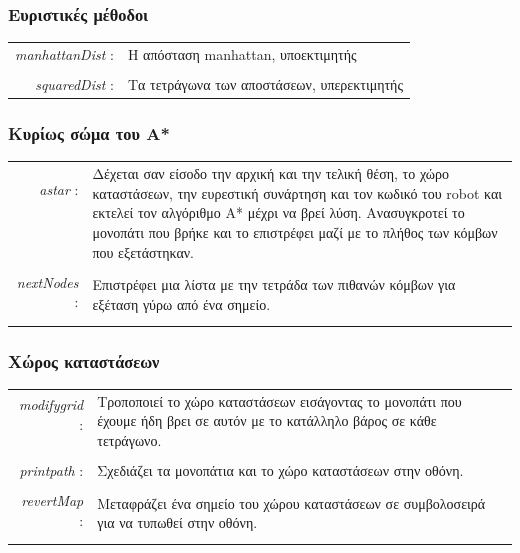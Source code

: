 \documentclass[a4paper,9pt]{article}
\begin{document}
\subsubsection{Eυριστικές μέθοδοι}
\begin{tabular}{r l}
    \emph{manhattanDist} :&Η απόσταση manhattan, υποεκτιμητής\\
    &\\
    \emph{squaredDist} :&Τα τετράγωνα των αποστάσεων, υπερεκτιμητής\\
\end{tabular}
\subsubsection{Κυρίως σώμα του Α*}
\begin{tabular}{r l}
    \emph{astar} :&\multirow{5}{10cm}{Δέχεται σαν είσοδο την αρχική και την τελική θέση, το χώρο
        καταστάσεων, την ευρεστική συνάρτηση και τον κωδικό του robot και εκτελεί
        τον αλγόριθμο Α* μέχρι να βρεί λύση. Ανασυγκροτεί το μονοπάτι που βρήκε
        και το επιστρέφει μαζί με το πλήθος των κόμβων που εξετάστηκαν.}\\
    &\\&\\&\\&\\&\\
    \emph{nextNodes} :&\multirow{2}{10cm}{Επιστρέφει μια λίστα με την τετράδα των πιθανών
        κόμβων για εξέταση γύρω από ένα σημείο.}\\
        &\\&\\
\end{tabular}
\subsubsection{Χώρος καταστάσεων}
\begin{tabular}{r l}
    \emph{modifygrid} :&\multirow{3}{10cm}{Τροποποιεί το χώρο καταστάσεων
        εισάγοντας το μονοπάτι που έχουμε ήδη βρει σε αυτόν με το κατάλληλο βάρος σε
        κάθε τετράγωνο.}\\
        &\\&\\&\\
    \emph{printpath} :&Σχεδιάζει τα μονοπάτια και το χώρο καταστάσεων στην
        οθόνη.\\
        &\\
    \emph{revertMap} :&\multirow{2}{10cm}{Μεταφράζει ένα σημείο του χώρου καταστάσεων σε
        συμβολοσειρά για να τυπωθεί στην οθόνη.}\\
        &\\&\\ 
\end{tabular}
\end{document}
